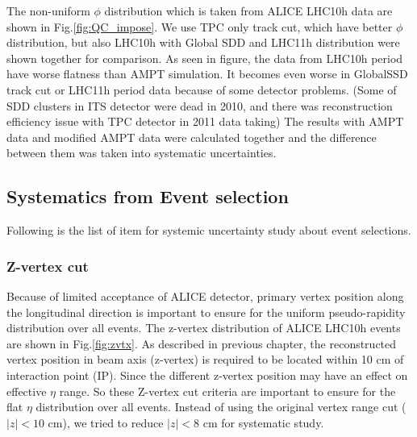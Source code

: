 The non-uniform $\phi$ distribution which is taken from ALICE LHC10h data are shown in Fig.\ref{fig:QC_impose}. We use TPC only track cut, which have better $\phi$ distribution, but also LHC10h with Global SDD and LHC11h distribution were shown together for comparison. As seen in figure, the data from LHC10h period have worse flatness than AMPT simulation. It becomes even worse in GlobalSSD track cut or LHC11h period data because of some detector problems. (Some of SDD clusters in ITS detector were dead in 2010, and there was reconstruction efficiency issue with TPC detector in 2011 data taking) The results with AMPT data and modified AMPT data were calculated together and the difference between them was taken into systematic uncertainties. 


	\subsection{Systematics from Event selection}
	
	Following is the list of item for systemic uncertainty study about event selections. 
	
\subsubsection{Z-vertex cut}

Because of limited acceptance of ALICE detector, primary vertex position along the longitudinal direction is important to ensure for the uniform pseudo-rapidity distribution over all events. The z-vertex distribution of ALICE LHC10h events are shown in Fig.\ref{fig:zvtx}.  As described in previous chapter, the reconstructed vertex position in beam axis (z-vertex) is required to be located within 10 cm of interaction point (IP). Since  the different z-vertex position may have an effect on effective $\eta$ range. So these Z-vertex cut criteria are important to ensure for the flat $\eta$ distribution over all events. 	Instead of using the original vertex range cut ($|z| < 10$ cm),  we tried to reduce $|z| < 8$ cm for systematic study.	
		

